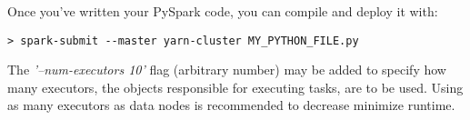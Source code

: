 \documentclass[9pt,twocolumn,twoside]{idsi}
\begin{document}
Once you've written your PySpark code, you can compile and deploy it with:
\begin{verbatim}
> spark-submit --master yarn-cluster MY_PYTHON_FILE.py
\end{verbatim}

\noindent
The \textit{'--num-executors 10'} flag (arbitrary number) may be added to specify how many executors, the objects responsible for executing tasks, are to be used. Using as many executors as data nodes is recommended to decrease minimize runtime.
\end{document}
